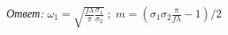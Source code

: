 \documentclass[a4paper,12pt]{article}
\begin{document}
\textit{Ответ:} $\omega_1 = \sqrt{\frac{f \lambda}{\pi}\frac{\sigma_1}{\sigma_2}} \; ; \; m = \left(\sigma_1\sigma_2\frac{\pi}{f \lambda} - 1\right) / 2 $






\end{document}
